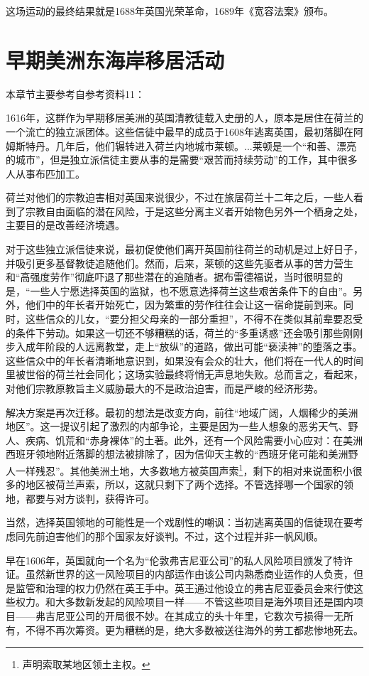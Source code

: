 \documentclass[12pt,oneside]{book}
\begin{document}
这场运动的最终结果就是1688年英国光荣革命，1689年《宽容法案》颁布。

\section{早期美洲东海岸移居活动}
本章节主要参考自参考资料11：

\begin{mdframed}

1616年，这群作为早期移居美洲的英国清教徒载入史册的人，原本是居住在荷兰的一个流亡的独立派团体。这些信徒中最早的成员于1608年逃离英国，最初落脚在阿姆斯特丹。几年后，他们辗转进入荷兰内地城市莱顿。...莱顿是一个“和善、漂亮的城市”，但是独立派信徒主要从事的是需要“艰苦而持续劳动”的工作，其中很多人从事布匹加工。

荷兰对他们的宗教迫害相对英国来说很少，不过在旅居荷兰十二年之后，一些人看到了宗教自由面临的潜在风险，于是这些分离主义者开始物色另外一个栖身之处，主要目的是改善经济境遇。

对于这些独立派信徒来说，最初促使他们离开英国前往荷兰的动机是过上好日子，并吸引更多基督教徒追随他们。然而，后来，莱顿的这些先驱者从事的苦力营生和“高强度劳作”彻底吓退了那些潜在的追随者。据布雷德福说，当时很明显的是，“一些人宁愿选择英国的监狱，也不愿意选择荷兰这些艰苦条件下的自由”。另外，他们中的年长者开始死亡，因为繁重的劳作往往会让这一宿命提前到来。同时，这些信众的儿女，“要分担父母亲的一部分重担”，不得不在类似其前辈要忍受的条件下劳动。如果这一切还不够糟糕的话，荷兰的“多重诱惑”还会吸引那些刚刚步入成年阶段的人远离教堂，走上“放纵”的道路，做出可能“亵渎神”的堕落之事。这些信众中的年长者清晰地意识到，如果没有会众的壮大，他们将在一代人的时间里被世俗的荷兰社会同化；这场实验最终将悄无声息地失败。总而言之，看起来，对他们宗教原教旨主义威胁最大的不是政治迫害，而是严峻的经济形势。

解决方案是再次迁移。最初的想法是改变方向，前往“地域广阔，人烟稀少的美洲地区”。这一提议引起了激烈的内部争论，主要是因为一些人想象的恶劣天气、野人、疾病、饥荒和“赤身裸体”的土著。此外，还有一个风险需要小心应对：在美洲西班牙领地附近落脚的想法被排除了，因为信仰天主教的“西班牙佬可能和美洲野人一样残忍”。其他美洲土地，大多数地方被英国声索\footnote{声明索取某地区领土主权。}，剩下的相对来说面积小很多的地区被荷兰声索，所以，这就只剩下了两个选择。不管选择哪一个国家的领地，都要与对方谈判，获得许可。

当然，选择英国领地的可能性是一个戏剧性的嘲讽：当初逃离英国的信徒现在要考虑同先前迫害他们的那个国家友好谈判。不过，这个过程并非一帆风顺。

早在1606年，英国就向一个名为“伦敦弗吉尼亚公司”的私人风险项目颁发了特许证。虽然新世界的这一风险项目的内部运作由该公司内熟悉商业运作的人负责，但是监管和治理的权力仍然在英王手中。英王通过他设立的弗吉尼亚委员会来行使这些权力。和大多数新发起的风险项目一样——不管这些项目是海外项目还是国内项目——弗吉尼亚公司的开局很不妙。在其成立的头十年里，它数次亏损得一无所有，不得不再次筹资。更为糟糕的是，绝大多数被送往海外的劳工都悲惨地死去。


\end{mdframed}
\end{document}
